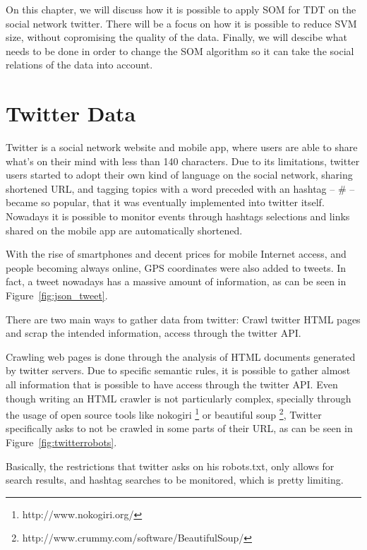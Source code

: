 \label{ch:clustering_tweets}
On this chapter, we will discuss how it is possible to apply \ac{SOM} for \ac{TDT} on the social network twitter. There will be a focus on how it is possible to reduce \ac{SVM} size, without copromising the quality of the data. 
Finally, we will descibe what needs to be done in order to change the \ac{SOM} algorithm so it can take the social relations of the data into account. 

\section{Twitter Data}
\label{sec:crawling_twitter}
Twitter is a social network website and mobile app, where users are able to share what's on their mind with less than 140 characters. Due to its limitations, twitter users started to adopt their own kind of language on the social network, sharing shortened \ac{URL}, and tagging topics with a word preceded with an hashtag -- \# -- became so popular, that it was eventually implemented into twitter itself. Nowadays it is possible to monitor events through hashtags selections and links shared on the mobile app are automatically shortened.   

With the rise of smartphones and decent prices for mobile Internet access, and people becoming always online, GPS coordinates were also added to tweets. In fact, a tweet nowadays has a massive amount of information, as can be seen in Figure~\ref{fig:json_tweet}.

There are two main ways to gather data from twitter: Crawl twitter HTML pages and scrap the intended information, access through the twitter API.

Crawling web pages is done through the analysis of HTML documents generated by twitter servers. Due to specific semantic rules, it is possible to gather almost all information that is possible to have access through the twitter API. Even though writing an HTML crawler is not particularly complex, specially through the usage of open source tools like nokogiri \footnote{http://www.nokogiri.org/} or beautiful soup \footnote{http://www.crummy.com/software/BeautifulSoup/}, Twitter specifically asks to not be crawled in some parts of their \ac{URL}, as can be seen in Figure~\ref{fig:twitterrobots}. 

Basically, the restrictions that twitter asks on his robots.txt, only allows for search results, and hashtag searches to be monitored, which is pretty limiting.

